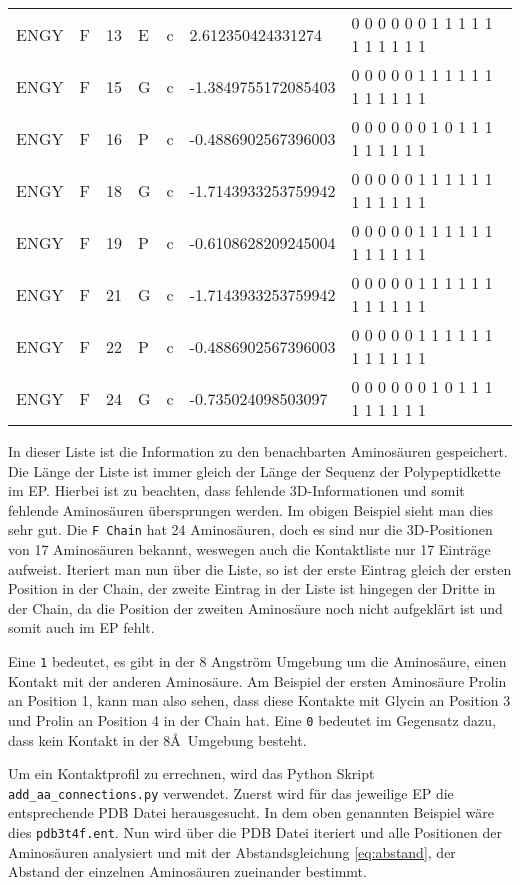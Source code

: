 \begin{table}[H]
{\begin{tabular}{lllllll}
    ENGY & F & 13 & E & c & 2.612350424331274 & 0 0 0 0 0 0 1 1 1 1 1 1 1 1 1 1 1 \\
    ENGY & F & 15 & G & c & -1.3849755172085403 & 0 0 0 0 0 1 1 1 1 1 1 1 1 1 1 1 1 \\
    ENGY & F & 16 & P & c & -0.4886902567396003 & 0 0 0 0 0 0 1 0 1 1 1 1 1 1 1 1 1 \\
    ENGY & F & 18 & G & c & -1.7143933253759942 & 0 0 0 0 0 1 1 1 1 1 1 1 1 1 1 1 1 \\
    ENGY & F & 19 & P & c & -0.6108628209245004 & 0 0 0 0 0 1 1 1 1 1 1 1 1 1 1 1 1 \\
    ENGY & F & 21 & G & c & -1.7143933253759942 & 0 0 0 0 0 1 1 1 1 1 1 1 1 1 1 1 1 \\
    ENGY & F & 22 & P & c & -0.4886902567396003 & 0 0 0 0 0 1 1 1 1 1 1 1 1 1 1 1 1 \\
    ENGY & F & 24 & G & c & -0.735024098503097 & 0 0 0 0 0 0 1 0 1 1 1 1 1 1 1 1 1
    \end{tabular}}
\end{table}

In dieser Liste ist die Information zu den benachbarten Aminosäuren gespeichert. Die Länge der Liste ist immer gleich der Länge der Sequenz der Polypeptidkette im EP. Hierbei ist zu beachten, dass fehlende 3D-Informationen und somit fehlende Aminosäuren übersprungen werden. Im obigen Beispiel sieht man dies sehr gut. Die \texttt{F Chain} hat 24 Aminosäuren, doch es sind nur die 3D-Positionen von 17 Aminosäuren bekannt, weswegen auch die Kontaktliste nur 17 Einträge aufweist. Iteriert man nun über die Liste, so ist der erste Eintrag gleich der ersten Position in der Chain, der zweite Eintrag in der Liste ist hingegen der Dritte in der Chain, da die Position der zweiten Aminosäure noch nicht aufgeklärt ist und somit auch im \ac{EP} fehlt.

Eine \texttt{1} bedeutet, es gibt in der 8 Angström Umgebung um die Aminosäure, einen Kontakt mit der anderen Aminosäure. Am Beispiel der ersten Aminosäure Prolin an Position 1, kann man also sehen, dass diese Kontakte mit Glycin an Position 3 und Prolin an Position 4 in der Chain hat. Eine \texttt{0} bedeutet im Gegensatz dazu, dass kein Kontakt in der 8\AA\ Umgebung besteht.

Um ein Kontaktprofil zu errechnen, wird das Python Skript \texttt{add\-\_aa\-\_connections.py} verwendet. Zuerst wird für das jeweilige \ac{EP} die entsprechende \ac{PDB} Datei herausgesucht. In dem oben genannten Beispiel wäre dies \texttt{pdb3t4f.ent}. Nun wird über die \ac{PDB} Datei iteriert und alle Positionen der Aminosäuren analysiert und mit der Abstandsgleichung \ref{eq:abstand}, der Abstand der einzelnen Aminosäuren zueinander bestimmt.

